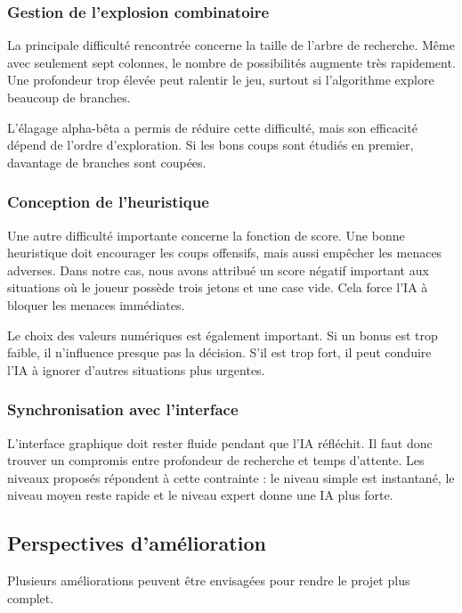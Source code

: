 \documentclass[12pt,a4paper]{article}
\begin{document}
\subsubsection{Gestion de l'explosion combinatoire}

La principale difficulté rencontrée concerne la taille de l'arbre de recherche. Même avec seulement sept colonnes, le nombre de possibilités augmente très rapidement. Une profondeur trop élevée peut ralentir le jeu, surtout si l'algorithme explore beaucoup de branches.

L'élagage alpha-bêta a permis de réduire cette difficulté, mais son efficacité dépend de l'ordre d'exploration. Si les bons coups sont étudiés en premier, davantage de branches sont coupées.

\subsubsection{Conception de l'heuristique}

Une autre difficulté importante concerne la fonction de score. Une bonne heuristique doit encourager les coups offensifs, mais aussi empêcher les menaces adverses. Dans notre cas, nous avons attribué un score négatif important aux situations où le joueur possède trois jetons et une case vide. Cela force l'IA à bloquer les menaces immédiates.

Le choix des valeurs numériques est également important. Si un bonus est trop faible, il n'influence presque pas la décision. S'il est trop fort, il peut conduire l'IA à ignorer d'autres situations plus urgentes.

\subsubsection{Synchronisation avec l'interface}

L'interface graphique doit rester fluide pendant que l'IA réfléchit. Il faut donc trouver un compromis entre profondeur de recherche et temps d'attente. Les niveaux proposés répondent à cette contrainte : le niveau simple est instantané, le niveau moyen reste rapide et le niveau expert donne une IA plus forte.


\subsection{Perspectives d'amélioration}

Plusieurs améliorations peuvent être envisagées pour rendre le projet plus complet.
\end{document}
